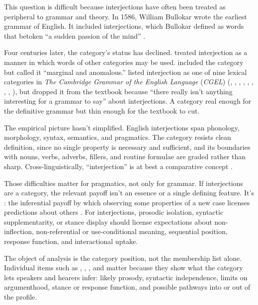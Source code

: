 \documentclass[12pt]{article}
\begin{document}
This question is difficult because interjections have often been treated
as peripheral to grammar and theory. In 1586, William Bullokar wrote the
earliest grammar of English. It included interjections, which Bullokar
defined as words that betoken \enquote{a sudden passion of the mind}
\citep[373]{bullokar1586}.

Four centuries later, the category's status has declined.
\textcite[90]{jespersen1924} treated interjection as a manner in which
words of other categories may be used.
\textcite[67]{quirk1985} included the category but called it
\enquote{marginal and anomalous.}
\textcite[22]{HuddlestonPullum2002} listed interjection as one of nine
lexical categories in \textit{The Cambridge Grammar of the English
Language} (\textit{CGEL}) (,
, , , ,
, , , ), but
\textcite[16]{HuddlestonPullum2005} dropped it from the textbook
because \enquote{there really isn't anything interesting for a grammar
to say} about interjections. A category real enough for the definitive
grammar but thin enough for the textbook to cut.

The empirical picture hasn't simplified. English interjections span
phonology, morphology, syntax, semantics, and pragmatics. The
category resists clean definition, since no single property is necessary
and sufficient, and its boundaries with nouns, verbs, adverbs,
fillers, and routine formulae are graded rather than sharp.
Cross-linguistically, \enquote{interjection} is at best a comparative
concept \citep{haspelmath2010}.

Those difficulties matter for pragmatics, not only for grammar. If
interjections are a category, the relevant payoff isn't an essence or a
single defining feature. It's : the inferential
payoff by which observing some properties of a new case licenses
predictions about others \citep{Goodman1955}. For interjections,
prosodic isolation, syntactic supplementarity, or stance display should
license expectations about non-inflection, non-referential or
use-conditional meaning, sequential position, response function, and
interactional uptake.

The object of analysis is the category position, not the membership list
alone. Individual items such as , ,
, and  matter because they show what the
category lets speakers and hearers infer: likely prosody, syntactic
independence, limits on argumenthood, stance or response function, and
possible pathways into or out of the profile.
\end{document}
